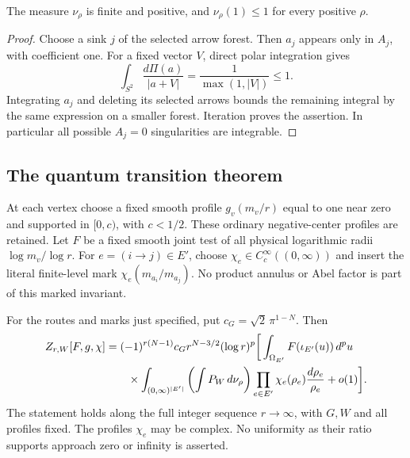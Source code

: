 \begin{lemma}\label{lem:ratio-finite}
The measure $\nu_\rho$ is finite and positive, and
$\nu_\rho(1)\le1$ for every positive $\rho$.
\end{lemma}
\begin{proof}
Choose a sink $j$ of the selected arrow forest. Then $a_j$ appears
only in $A_j$, with coefficient one. For a fixed vector $V$,
direct polar integration gives
\[
 \int_{S^2}\frac{d\Pi(a)}{|a+V|}
   =\frac1{\max(1,|V|)}\le1.
\]
Integrating $a_j$ and deleting its selected arrows bounds the
remaining integral by the same expression on a smaller forest.
Iteration proves the assertion. In particular all possible
$A_j=0$ singularities are integrable.
\end{proof}

\subsection{The quantum transition theorem}
At each vertex choose a fixed smooth profile $g_v(m_v/r)$ equal to
one near zero and supported in $[0,c)$, with $c<1/2$. These ordinary
negative-center profiles are retained. Let $F$ be a fixed smooth
joint test of all physical logarithmic radii $\log m_v/\log r$.
For $e=(i\to j)\in E'$, choose
$\chi_e\in C_c^\infty((0,\infty))$ and insert the literal
finite-level mark $\chi_e(m_{a_i}/m_{a_j})$. No product annulus or
Abel factor is part of this marked invariant.

\begin{theorem}
\label{thm:ratio}
For the routes and marks just specified, put
$c_G=\sqrt2\,\pi^{1-N}$. Then
\begin{align}
 Z_{r,W}[F,g,\chi]
 &=(-1)^{r(N-1)}c_G r^{N-3/2}(\log r)^p
 \bigg[
 \int_{\Omega_{E'}}F(\iota_{E'}(u))\,d^pu\notag\\
 &\qquad\times
 \int_{(0,\infty)^{|E'|}}
      \left(\int P_W\,d\nu_\rho\right)
      \prod_{e\in E'}\chi_e(\rho_e)\frac{d\rho_e}{\rho_e}
 +o(1)\bigg].\label{eq:ratio-quantum}
\end{align}
The statement holds along the full integer sequence $r\to\infty$,
with $G,W$ and all profiles fixed. The profiles $\chi_e$ may be complex.
No uniformity as their ratio supports approach zero or infinity is
asserted.
\end{theorem}


